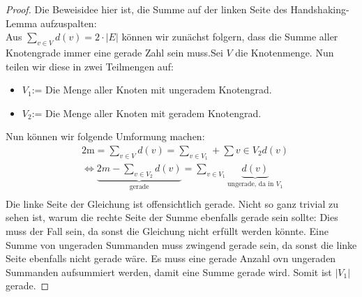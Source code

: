 \documentclass{article}
\begin{document}
\begin{proof}
	Die Beweisidee hier ist, die Summe auf der linken Seite des Handshaking-Lemma aufzuspalten:\\
	Aus $\sum_{v \in V}d(v) = 2 \cdot |E|$ können wir zunächst folgern, dass die Summe aller Knotengrade immer eine gerade Zahl sein muss.Sei $V$ die Knotenmenge. Nun teilen wir diese in zwei Teilmengen auf:
		\begin{itemize}
			\item{$V_1$:= Die Menge aller Knoten mit ungeradem Knotengrad.}
			\item{$V_2$:= Die Menge aller Knoten mit geradem Knotengrad.}
		\end{itemize}
	Nun können wir folgende Umformung machen:
		\begin{align*}
			&2\text{m} = \sum_{v \in V}d(v) = \sum_{v \in V_1} + \sum{v \in V_2}d(v)\\
			&\Leftrightarrow \underbrace{2m - \sum_{v \in V_2}d(v)}_{\text{gerade}} = \sum_{v \in V_1}\underbrace{d(v)}_{\text{ungerade, da in $V_1$}}\\
		\end{align*}
	Die linke Seite der Gleichung ist offensichtlich gerade. Nicht so ganz trivial zu sehen ist, warum die rechte Seite der Summe ebenfalls gerade sein sollte: Dies muss der Fall sein, da sonst die Gleichung nicht erfüllt werden könnte. Eine Summe von ungeraden Summanden muss zwingend gerade sein, da sonst die linke Seite ebenfalls nicht gerade wäre. Es muss eine gerade Anzahl ovn ungeraden Summanden aufsummiert werden, damit eine Summe gerade wird. Somit ist $|V_1|$ gerade.
\end{proof}
\newpage
\end{document}
